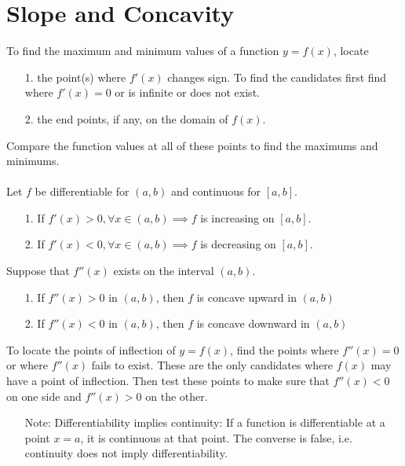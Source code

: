 \documentclass[10pt]{report}
\begin{document}
\section{Slope and Concavity}
To find the maximum and minimum values of a function $y=f(x)$, locate
\begin{itemize}
\item[1.] the point(s) where $f'(x)$ changes sign. To find the candidates first find where $f'(x)=0$ or is infinite or does not exist.
\item[2.]the end points, if any, on the domain of $f(x)$.
\end{itemize}
Compare the function values at all of these points to find the maximums and minimums.\\\\
Let $f$ be differentiable for $(a,b)$ and continuous for $[a,b]$.
\begin{itemize}
\item[1.]If $f'(x)>0, \forall x\in (a,b)\implies f$ is increasing on $[a,b]$.
\item[2.]If $f'(x)<0, \forall x\in (a,b)\implies f$ is decreasing on $[a,b]$.
\end{itemize}
Suppose that $f''(x)$ exists on the interval $(a,b)$.
\begin{itemize}
\item[1.]If $f''(x)>0$ in $(a,b)$, then $f$ is concave upward in $(a,b)$
\item[2.]If $f''(x)<0$ in $(a,b)$, then $f$ is concave downward in $(a,b)$
\end{itemize}
To locate the points of inflection of $y=f(x)$, find the points where $f''(x)=0$ or where $f''(x)$ fails to exist. These are the only candidates where $f(x)$ may have a point of inflection. Then test these points to make sure that $f''(x)<0$ on one side and $f''(x)>0$ on the other.
\begin{itemize}
\item[Note:] Differentiability implies continuity: If a function is differentiable at a point $x=a$, it is continuous at that point. The converse is false, i.e. continuity does not imply differentiability.
\end{itemize}
\end{document}
